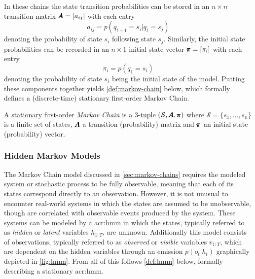 In these chains the state transition probabilities can be stored in an $n \times n$ transition matrix $\pmb{A} = [a_{ij}]$ with each entry
\begin{equation}
a_{ij} = p(q_{t+1} = s_i\vert q_t = s_j)
\end{equation}
denoting the probability of state $s_i$ following state $s_j$.
Similarly, the initial state probabilities can be recorded in an $n \times 1$ initial state vector $\pmb{\pi} = [\pi_i]$ with each entry
\begin{equation}
\pi_i = p(q_1 = s_i)
\end{equation} 
denoting the probability of state $s_i$ being the initial state of the model.
Putting these components together yields \autoref{def:markov-chain} below, which formally defines a (discrete-time) stationary first-order Markov Chain.

\begin{definition}
	\label{def:markov-chain}
	A stationary first-order \textit{Markov Chain} is a 3-tuple $(\mathcal{S}, \pmb{A}, \pmb{\pi})$ where $\mathcal{S} = \{s_1, \ldots, s_n\}$ is a finite set of states, $\pmb{A}$ a transition (probability) matrix and $\pmb{\pi}$ an initial state (probability) vector.
\end{definition}

\newpage

\subsubsection{Hidden Markov Models}
\label{sec:hidden-markov-models}

The Markov Chain model discussed in \autoref{sec:markov-chains} requires the modeled system or stochastic process to be fully observable, meaning that each of its states correspond directly to an observation.
However, it is not unusual to encounter real-world systems in which the states are assumed to be unobservable, though are correlated with observable events produced by the system.
These systems can be modeled by a \acrfull{acr:hmm} in which the states, typically referred to as \textit{hidden} or \textit{latent} variables $h_{1:T}$, are unknown.
Additionally this model consists of observations, typically referred to as \textit{observed} or \textit{visible} variables $v_{1:T}$, which are dependent on the hidden variables through an emission $p(o_t\vert h_t)$ graphically depicted in \autoref{fig:hmm}. From all of this follows \autoref{def:hmm} below, formally describing a stationary \acrshort{acr:hmm}.


